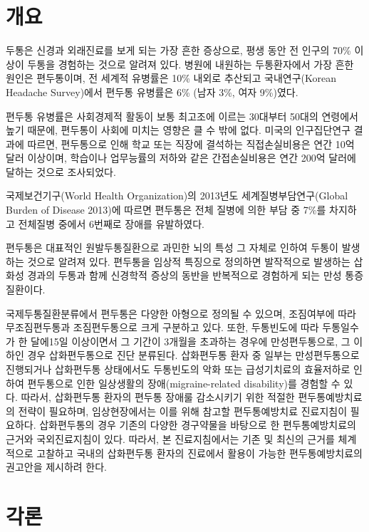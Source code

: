 \documentclass[]{book}
\begin{document}
\hypertarget{section-7}{%
\chapter{개요}\label{section-7}}

두통은 신경과 외래진료를 보게 되는 가장 흔한 증상으로, 평생 동안 전 인구의 70\% 이상이 두통을 경험하는 것으로 알려져 있다. 병원에 내원하는 두통환자에서 가장 흔한 원인은 편두통이며, 전 세계적 유병률은 10\% 내외로 추산되고 국내연구(Korean Headache Survey)에서 편두통 유병률은 6\% (남자 3\%, 여자 9\%)였다.

편두통 유병률은 사회경제적 활동이 보통 최고조에 이르는 30대부터 50대의 연령에서 높기 때문에, 편두통이 사회에 미치는 영향은 클 수 밖에 없다. 미국의 인구집단연구 결과에 따르면, 편두통으로 인해 학교 또는 직장에 결석하는 직접손실비용은 연간 10억 달러 이상이며, 학습이나 업무능률의 저하와 같은 간접손실비용은 연간 200억 달러에 달하는 것으로 조사되었다.

국제보건기구(World Health Organization)의 2013년도 세계질병부담연구(Global Burden of Disease 2013)에 따르면 편두통은 전체 질병에 의한 부담 중 7\%를 차지하고 전체질병 중에서 6번째로 장애를 유발하였다.

편두통은 대표적인 원발두통질환으로 과민한 뇌의 특성 그 자체로 인하여 두통이 발생하는 것으로 알려져 있다. 편두통을 임상적 특징으로 정의하면 발작적으로 발생하는 삽화성 경과의 두통과 함께 신경학적 증상의 동반을 반복적으로 경험하게 되는 만성 통증질환이다.

국제두통질환분류에서 편두통은 다양한 아형으로 정의될 수 있으며, 조짐여부에 따라 무조짐편두통과 조짐편두통으로 크게 구분하고 있다. 또한, 두통빈도에 따라 두통일수가 한 달에15일 이상이면서 그 기간이 3개월을 초과하는 경우에 만성편두통으로, 그 이하인 경우 삽화편두통으로 진단 분류된다. 삽화편두통 환자 중 일부는 만성편두통으로 진행되거나 삽화편두통 상태에서도 두통빈도의 악화 또는 급성기치료의 효율저하로 인하여 편두통으로 인한 일상생활의 장애(migraine-related disability)를 경험할 수 있다. 따라서, 삽화편두통 환자의 편두통 장애룰 감소시키기 위한 적절한 편두통예방치료의 전략이 필요하며, 임상현장에서는 이를 위해 참고할 편두통예방치료 진료지침이 필요하다. 삽화편두통의 경우 기존의 다양한 경구약물을 바탕으로 한 편두통예방치료의 근거와 국외진료지침이 있다. 따라서, 본 진료지침에서는 기존 및 최신의 근거를 체계적으로 고찰하고 국내의 삽화편두통 환자의 진료에서 활용이 가능한 편두통예방치료의 권고안을 제시하려 한다.

\hypertarget{section-8}{%
\chapter{각론}\label{section-8}}
\end{document}
